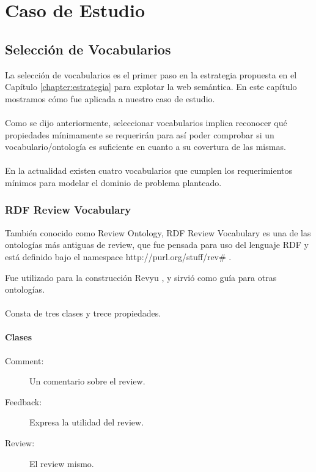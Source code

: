 \part{Caso de Estudio}

\chapter{Selección de Vocabularios}
\label{chapter:seleccion}
La selección de vocabularios es el primer paso en la estrategia propuesta en el Capítulo \ref{chapter:estrategia} para explotar la web semántica. En este capítulo mostramos cómo fue aplicada a nuestro caso de estudio.
\\\\
Como se dijo anteriormente, seleccionar vocabularios implica reconocer qué \\\noindent propiedades mínimamente se requerirán para así poder comprobar 
si un vocabulario/ontología es suficiente en cuanto a su covertura de las mismas.\\\\
En la actualidad existen cuatro vocabularios que cumplen los requerimientos mínimos para modelar el dominio de problema planteado.

\section{RDF Review Vocabulary}
\label{section:review-ontology}

También conocido como Review Ontology, RDF Review Vocabulary es una de las ontologías más antiguas de review, que fue pensada para uso del lenguaje 
RDF y está definido bajo el namespace http://purl.org/stuff/rev\# .

Fue utilizado para la construcción Revyu , y sirvió como guía para otras ontologías.
\\\\
Consta de tres clases y trece propiedades.
\subsection{Clases}
\begin{description}
  \item [Comment:] Un comentario sobre el review. 
  \item [Feedback:] Expresa la utilidad del review. 
  \item [Review:] El review mismo. 
\end{description}

